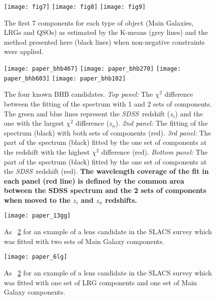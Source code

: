 \documentclass[12pt,preprint]{aastex}
\newcommand{\project}[1]{\textsl{#1}}
\newcommand{\sdss}{\project{SDSS}}
\newcommand{\SDSS}{\sdss}
\begin{document}
\clearpage
\begin{figure}
\texttt{[image: fig7]}
\texttt{[image: fig8]}
\texttt{[image: fig9]}
\caption{The first 7 components for each type of object (Main Galaxies,
  LRGs and QSOs) as estimated by the K-means (grey lines) and the method
  presented here (black lines) when non-negative constraints were
  applied.}
\label{fig:5}
\end{figure}

\clearpage
\begin{figure}
\texttt{[image: paper\_bhb467]}
\texttt{[image: paper\_bhb270]}
\texttt{[image: paper\_bhb603]}
\texttt{[image: paper\_bhb102]}
\caption{The four known BHB candidates. \textsl{Top panel:} The
  $\chi^2$ difference between the fitting of the spectrum with 1 and 2
  sets of components. The green and blue lines represent the \SDSS\  
  redshift ($z_i$) and the one with the largest $\chi^2$
  difference ($z_n$). \textsl{2nd panel:} The fitting of the spectrum (black)
  with both sets of components (red). \textsl{3rd panel:} The part of
  the spectrum (black) fitted by the one set of components at the
  redshift with the highest $\chi^2$ difference (red). \textsl{Bottom
    panel:} The part of the spectrum (black) fitted by the one set of
  components at the \SDSS\ redshift (red). \textbf{The wavelength coverage 
of the fit in each panel (red line) is defined by the common area between the SDSS spectrum and 
the 2 sets of components when moved to the $z_i$ and $z_n$ redshifts.}}
\label{fig:6a}
\end{figure}

\clearpage
\begin{figure}
\texttt{[image: paper\_13gg]}
\caption{As \figurename~\ref{fig:6a} for an example of a lens candidate in the SLACS survey
  which was fitted with two sets of Main Galaxy components.}
\label{fig:6}
\end{figure}

\clearpage
\begin{figure}
\texttt{[image: paper\_6lg]}
\caption{As \figurename~\ref{fig:6a} for an example of a lens candidate in the SLACS survey
  which was fitted with one set of LRG components and one set of
  Main Galaxy components.}
\label{fig:7}
\end{figure}
\end{document}

